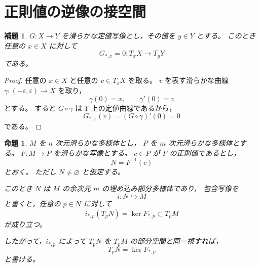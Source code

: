 \documentclass[uplatex,dvipdfmx]{jsarticle}
\newtheorem{proposition}{命題}
\newtheorem{lemma}{補題}
\theoremstyle{definition}
\begin{document}
\section*{正則値の逆像の接空間}

\begin{lemma}
$G:X\to Y$ を滑らかな定値写像とし，その値を $y\in Y$ とする。
このとき任意の $x\in X$ に対して
\[
  G_{*,x}=0:T_xX\to T_yY
\]
である。
\end{lemma}

\begin{proof}
任意の $x\in X$ と任意の $v\in T_xX$ を取る。
$v$ を表す滑らかな曲線
$\gamma:(-\varepsilon,\varepsilon)\to X$ を取り，
\[
  \gamma(0)=x,
  \qquad
  \gamma'(0)=v
\]
とする。
すると $G\circ\gamma$ は $Y$ 上の定値曲線であるから，
\[
  G_{*,x}(v)=(G\circ\gamma)'(0)=0
\]
である。
\end{proof}

\begin{proposition}
$M$ を $n$ 次元滑らかな多様体とし，
$P$ を $m$ 次元滑らかな多様体とする。
$F:M\to P$ を滑らかな写像とする。
$c\in P$ が $F$ の正則値であるとし，
\[
  N=F^{-1}(c)
\]
とおく。
ただし $N\ne\varnothing$ と仮定する。

このとき $N$ は $M$ の余次元 $m$ の埋め込み部分多様体であり，
包含写像を
\[
  i:N\hookrightarrow M
\]
と書くと，任意の $p\in N$ に対して
\[
  i_{*,p}(T_pN)=\ker F_{*,p}\subset T_pM
\]
が成り立つ。

したがって，$i_{*,p}$ によって $T_pN$ を $T_pM$ の部分空間と同一視すれば，
\[
  T_pN=\ker F_{*,p}
\]
と書ける。
\end{proposition}
\end{document}
